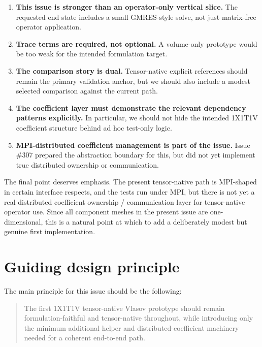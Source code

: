 \documentclass[11pt]{article}
\begin{document}
\begin{enumerate}[leftmargin=2em]
\item \textbf{This issue is stronger than an operator-only vertical slice.} The requested end state includes a small GMRES-style solve, not just matrix-free operator application.

\item \textbf{Trace terms are required, not optional.} A volume-only prototype would be too weak for the intended formulation target.

\item \textbf{The comparison story is dual.} Tensor-native explicit references should remain the primary validation anchor, but we should also include a modest selected comparison against the current path.

\item \textbf{The coefficient layer must demonstrate the relevant dependency patterns explicitly.} In particular, we should not hide the intended 1X1T1V coefficient structure behind ad hoc test-only logic.

\item \textbf{MPI-distributed coefficient management is part of the issue.} Issue \#307 prepared the abstraction boundary for this, but did not yet implement true distributed ownership or communication.
\end{enumerate}

The final point deserves emphasis. The present tensor-native path is MPI-shaped in certain interface respects, and the tests run under MPI, but there is not yet a real distributed coefficient ownership / communication layer for tensor-native operator use. Since all component meshes in the present issue are one-dimensional, this is a natural point at which to add a deliberately modest but genuine first implementation.

\section{Guiding design principle}

The main principle for this issue should be the following:

\begin{quote}
The first 1X1T1V tensor-native Vlasov prototype should remain formulation-faithful and tensor-native throughout, while introducing only the minimum additional helper and distributed-coefficient machinery needed for a coherent end-to-end path.
\end{quote}
\end{document}
